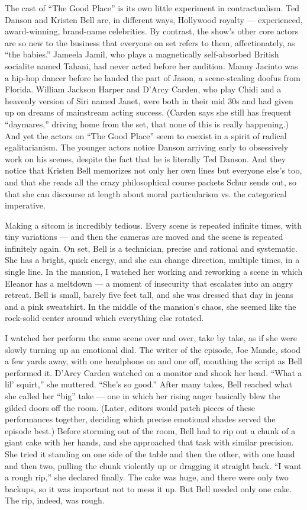 The cast of ``The Good Place'' is its own little experiment in
contractualism. Ted Danson and Kristen Bell are, in different ways,
Hollywood royalty --- experienced, award-winning, brand-name
celebrities. By contrast, the show's other core actors are so new to the
business that everyone on set refers to them, affectionately, as ``the
babies.'' Jameela Jamil, who plays a magnetically self-absorbed British
socialite named Tahani, had never acted before her audition. Manny
Jacinto was a hip-hop dancer before he landed the part of Jason, a
scene-stealing doofus from Florida. William Jackson Harper and D'Arcy
Carden, who play Chidi and a heavenly version of Siri named Janet, were
both in their mid 30s and had given up on dreams of mainstream acting
success. (Carden says she still has frequent ``daymares,'' driving home
from the set, that none of this is really happening.) And yet the actors
on ``The Good Place'' seem to coexist in a spirit of radical
egalitarianism. The younger actors notice Danson arriving early to
obsessively work on his scenes, despite the fact that he is literally
Ted Danson. And they notice that Kristen Bell memorizes not only her own
lines but everyone else's too, and that she reads all the crazy
philosophical course packets Schur sends out, so that she can discourse
at length about moral particularism vs. the categorical imperative.

Making a sitcom is incredibly tedious. Every scene is repeated infinite
times, with tiny variations --- and then the cameras are moved and the
scene is repeated infinitely again. On set, Bell is a technician,
precise and rational and systematic. She has a bright, quick energy, and
she can change direction, multiple times, in a single line. In the
mansion, I watched her working and reworking a scene in which Eleanor
has a meltdown --- a moment of insecurity that escalates into an angry
retreat. Bell is small, barely five feet tall, and she was dressed that
day in jeans and a pink sweatshirt. In the middle of the mansion's
chaos, she seemed like the rock-solid center around which everything
else rotated.

I watched her perform the same scene over and over, take by take, as if
she were slowly turning up an emotional dial. The writer of the episode,
Joe Mande, stood a few yards away, with one headphone on and one off,
mouthing the script as Bell performed it. D'Arcy Carden watched on a
monitor and shook her head. ``What a lil' squirt,'' she muttered.
``She's so good.'' After many takes, Bell reached what she called her
``big'' take --- one in which her rising anger basically blew the gilded
doors off the room. (Later, editors would patch pieces of these
performances together, deciding which precise emotional shades served
the episode best.) Before storming out of the room, Bell had to rip out
a chunk of a giant cake with her hands, and she approached that task
with similar precision. She tried it standing on one side of the table
and then the other, with one hand and then two, pulling the chunk
violently up or dragging it straight back. ``I want a rough rip,'' she
declared finally. The cake was huge, and there were only two backups, so
it was important not to mess it up. But Bell needed only one cake. The
rip, indeed, was rough.

